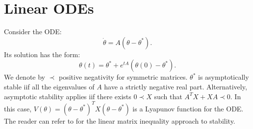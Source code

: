 \documentclass[10pt,conference,letterpaper]{IEEEtran}
\begin{document}
\section{Linear ODEs}\label{app:linear_ode}
	Consider the \ac{ODE}:
\begin{equation}\label{eq:son_linear_ode_app}
	\dot{\theta} = A (\theta - \theta^*).
\end{equation}
Its solution has the form:
\begin{equation}\label{eq:son_linear_ode_sol}
	\theta(t) =  \theta^* +  e^{t A} (\theta(0) - \theta^*).
\end{equation}
	We denote by $\prec$ positive negativity for symmetric matrices. $\theta^*$ is asymptotically stable iif all the eigenvalues of $A$ have a strictly negative real part. Alternatively, asymptotic stability applies iif there exists $0 \prec X$ such that $A^T X +  X A \prec 0$. In this case, $V(\theta)= (\theta - \theta^*)^T  X (\theta - \theta^*)$ is a Lyapunov function for the \ac{ODE}. The reader can refer to \cite{LMIControlBoyd} for the linear matrix inequality approach to stability.
\end{document}
